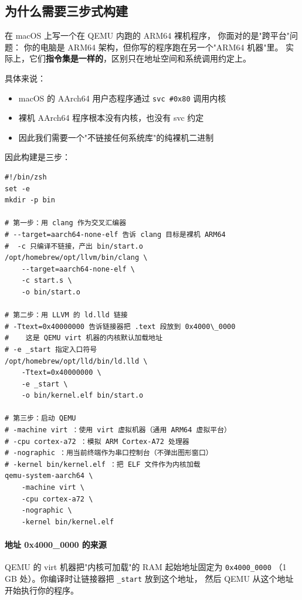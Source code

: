 \subsection{为什么需要三步式构建}

在 macOS 上写一个在 QEMU 内跑的 ARM64 裸机程序，
你面对的是"跨平台"问题：
你的电脑是 ARM64 架构，但你写的程序跑在另一个"ARM64 机器"里。
实际上，它们\textbf{指令集是一样的}，区别只在地址空间和系统调用约定上。

具体来说：

\begin{itemize}
    \item macOS 的 AArch64 用户态程序通过 \texttt{svc \#0x80} 调用内核
    \item 裸机 AArch64 程序根本没有内核，也没有 svc 约定
    \item 因此我们需要一个"不链接任何系统库"的纯裸机二进制
\end{itemize}

因此构建是三步：

\begin{lstlisting}[style=bashstyle,caption=QEMU/run.sh — 编译脚本]
#!/bin/zsh
set -e
mkdir -p bin

# 第一步：用 clang 作为交叉汇编器
# --target=aarch64-none-elf 告诉 clang 目标是裸机 ARM64
#  -c 只编译不链接，产出 bin/start.o
/opt/homebrew/opt/llvm/bin/clang \
    --target=aarch64-none-elf \
    -c start.s \
    -o bin/start.o

# 第二步：用 LLVM 的 ld.lld 链接
# -Ttext=0x40000000 告诉链接器把 .text 段放到 0x4000\_0000
#    这是 QEMU virt 机器的内核默认加载地址
# -e _start 指定入口符号
/opt/homebrew/opt/lld/bin/ld.lld \
    -Ttext=0x40000000 \
    -e _start \
    -o bin/kernel.elf bin/start.o

# 第三步：启动 QEMU
# -machine virt ：使用 virt 虚拟机器（通用 ARM64 虚拟平台）
# -cpu cortex-a72 ：模拟 ARM Cortex-A72 处理器
# -nographic ：用当前终端作为串口控制台（不弹出图形窗口）
# -kernel bin/kernel.elf ：把 ELF 文件作为内核加载
qemu-system-aarch64 \
    -machine virt \
    -cpu cortex-a72 \
    -nographic \
    -kernel bin/kernel.elf
\end{lstlisting}

\paragraph{地址 0x4000\_0000 的来源}
QEMU 的 virt 机器把"内核可加载"的 RAM 起始地址固定为 \texttt{0x4000\_0000}
（1 GB 处）。你编译时让链接器把 \texttt{\_start} 放到这个地址，
然后 QEMU 从这个地址开始执行你的程序。

